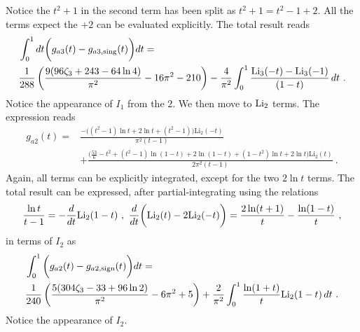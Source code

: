 \documentclass[a4paper,11pt]{article}
\begin{document}
Notice the $t^2+1$ in the second term has been split as $t^2+1=t^2-1+2$. All the terms expect the $+2$ can be evaluated explicitly. The total result reads
\begin{align}
    &\int_{0}^1dt\bigg( g_{a3}(t)-g_{a3,{\rm sing}}(t) \bigg) dt=\nonumber \\ 
    &\frac{1}{288} \left(\frac{9 (96 \zeta_3+243-64 \ln4) }{\pi ^2}-16 \pi ^2-210\right)-\frac{4}{\pi^2}\int_0^1 \frac{\text{Li}_3(-t)-\text{Li}_3(-1)}{(1-t)} \, dt \ .
\end{align}
Notice the appearance of $I_1$ from the $2$. We then move to ${\rm Li}_2$ terms. The expression reads
\begin{align}
g_{a2}(t)=&\frac{ -\bigg((t^2-1)\ln t+2\ln t+(t^2-1)\bigg)\text{Li}_2(-t)}{\pi ^2(t-1)}\nonumber \\ 
&+\frac{ \bigg(\frac{53}{6}-t^2+(t^2-1)\ln(1-t)+2\ln(1-t)+(1-t^2)\ln t+2\ln t\bigg)\text{Li}_2(t)}{2\pi ^2(t-1)} \ .
\end{align}
Again, all terms can be explicitly integrated, except for the two $2\ln t$ terms. The total result can be expressed, after partial-integrating using the relations
\begin{align}
\frac{\ln t}{t-1}=-\frac{d}{dt}{\rm Li}_2(1-t) \ , \  \frac{d}{dt}\bigg(\text{Li}_2(t)-2 \text{Li}_2(-t)\bigg)=\frac{2 \ln (t+1)}{t}-\frac{\ln (1-t)}{t} \ ,
\end{align}
in terms of $I_2$ as
\begin{align}
&\int_{0}^{1} \bigg(g_{a2}(t)-g_{a2,{\rm sign}}(t)\bigg) dt = \nonumber \\ 
&\frac{1}{240} \left(\frac{5 (304 \zeta_3-33+96 \ln2)}{\pi ^2}-6 \pi ^2+5\right)+\frac{2}{\pi^2}\int_0^1 \frac{ \ln (1+t)}{t} \text{Li}_2(1-t)\, dt \ .
\end{align}
Notice the appearance of $I_2$. 
\end{document}

